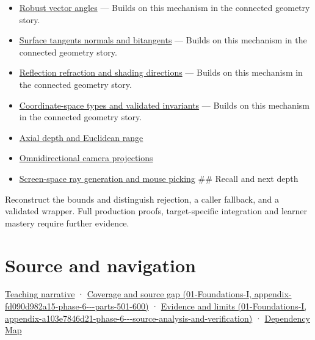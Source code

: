 \begin{itemize}
\item
  \hyperref[appendix-e569e60e18e6]{Robust vector angles} --- Builds on this mechanism in the connected geometry story.
\item
  \hyperref[appendix-e31893dec985]{Surface tangents normals and bitangents} --- Builds on this mechanism in the connected geometry story.
\item
  \hyperref[appendix-44e00863b4d5]{Reflection refraction and shading directions} --- Builds on this mechanism in the connected geometry story.
\item
  \hyperref[appendix-380a220e2529]{Coordinate-space types and validated invariants} --- Builds on this mechanism in the connected geometry story.
\item
  \hyperref[appendix-cac01ebeeb11]{Axial depth and Euclidean range}
\item
  \hyperref[appendix-fc99ad39f351]{Omnidirectional camera projections}
\item
  \hyperref[appendix-f1a6d43e80d1]{Screen-space ray generation and mouse picking} \#\# Recall and next depth
\end{itemize}

Reconstruct the bounds and distinguish rejection, a caller fallback, and a validated wrapper. Full production proofs, target-specific integration and learner mastery require further evidence.

\section{Source and navigation}\label{appendix-f744e41b95b4-source-and-navigation}

\href{Continuous\%20Notes/Computing\%20Foundations\%20-\%20From\%20Bits\%20to\%20C++\%20and\%20Systems\%20APIs\#A\%20direction\%20can\%20exist\%20even\%20when\%20the\%20naive\%20length\%20overflows}{Teaching narrative} · \href{../01-Foundations-I/main.pdf\#nameddest=appendix-fd090d982a15-phase-6---parts-501-600}{Coverage and source gap (01-Foundations-I, appendix-fd090d982a15-phase-6-\/-\/-parts-501-600)} · \href{../01-Foundations-I/main.pdf\#nameddest=appendix-a103e7846d21-phase-6---source-analysis-and-verification}{Evidence and limits (01-Foundations-I, appendix-a103e7846d21-phase-6-\/-\/-source-analysis-and-verification)} · \hyperref[appendix-4ad47bdd269a]{Dependency Map}

